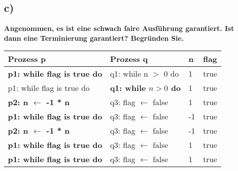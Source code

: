 \documentclass[12pt,pdftex,a4paper]{article}
\begin{document}
\subsection*{c)}
\textbf{ Angenommen, es ist eine schwach faire Ausführung garantiert. Ist dann
eine Terminierung garantiert? Begründen Sie.}\newline
\begin{tabular}[c]{|l|l|l|l|}
\hline
Prozess p&Prozess q&n&flag\\
\hline
\textbf{p1: while flag is true do}&q1: while n $>$ 0 do&1&true\\
p1: while flag is true do&\textbf{q1: while $n > 0$ do}&1&true\\
\textbf{p2: n $\leftarrow$ -1 * n}&q3: flag $\leftarrow$ false&1&true\\
\textbf{p1: while flag is true do}&q3: flag $\leftarrow$ false&-1&true\\
\textbf{p2: n $\leftarrow$ -1 * n}&q3: flag $\leftarrow$ false&-1&true\\
\textbf{p1: while flag is true do}&q3: flag $\leftarrow$ false&1&true\\
\textbf{p1: while flag is true do}&q3: flag $\leftarrow$ false&1&true\\
\hline
\end{tabular}\newline\newline
\end{document}
